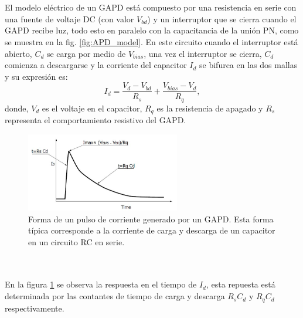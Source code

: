\\ \\
El modelo eléctrico  de un GAPD está compuesto por una resistencia en serie con una fuente de voltaje DC (con valor $V_{bd}$) y un interruptor que se cierra cuando el GAPD recibe luz, todo esto en paralelo con la capacitancia de la unión PN, como se muestra en la fig. \ref{fig:APD_model}. En este circuito cuando el interruptor está abierto, $C_d$ se carga por medio de $V_{bias}$, una vez el interruptor se cierra, $C_d$ comienza a descargarse y la corriente del capacitor $I_d$ se bifurca en las dos mallas y su expresión es:
\begin{equation}
    I_d=\frac{V_d-V_{bd}}{R_s}+\frac{V_{bias}-V_d}{R_q},
\end{equation}
donde, $V_d$ es el voltaje en el capacitor, $R_q$ es la resistencia de apagado y $R_s$ representa el comportamiento resistivo del GAPD.
\begin{figure}[h!]
\begin{centering}
  \includegraphics[width=0.6\textwidth]{Images/GAPD_response.JPG}
    \caption{Forma de un pulso de corriente generado por un GAPD. Esta forma típica corresponde a la corriente de carga y descarga de un capacitor en un circuito RC en serie.}
    \label{fig:APD_response}  
  \par\end{centering}
\end{figure}
\\ \\
En la figura \ref{fig:APD_response} se observa la respuesta en el tiempo de $I_d$, esta repuesta está determinada por las contantes de tiempo de carga y descarga  $R_s C_d$ y $R_q C_d$ respectivamente.\\    
